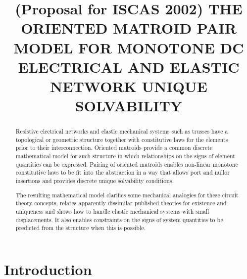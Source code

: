 \documentclass{article}
\title{\extra{REPORT:}
(Proposal for ISCAS 2002)
THE ORIENTED MATROID PAIR MODEL FOR MONOTONE
DC ELECTRICAL AND ELASTIC NETWORK UNIQUE SOLVABILITY
}
\newcommand{\extra}[1]{}
\begin{document}
\ninept
%
\maketitle
%

\begin{abstract}
Resistive electrical networks and elastic mechanical systems such
as trusses have a topological or geometric structure together with constitutive
laws for the elements prior to their interconnection.
Oriented matroids provide a common discrete mathematical model 
for such 
structure
in which relationships on the signs of element 
quantities can be expressed.
Pairing of oriented matroids
enables non-linear monotone constitutive laws to be fit
into the abstraction in a way that allows port and nullor
insertions and provides discrete unique solvability conditions.

The resulting mathematical model clarifies some mechanical analogies for 
these 
circuit theory concepts, 
relates apparently dissimilar published theories
for existence and uniqueness and shows how to 
handle elastic mechanical systems with small displacements.
It also enables constraints on the signs of system quantities
to be predicted from the structure when this is possible.
\extra{Finally, it 
derives topological solution formulas for linearized mechanical 
systems in which the analog of a tree-sum is a sum over minimally rigid
trusses.}
\end{abstract}
%

\section{Introduction}
\label{sec:intro}

\end{document}

